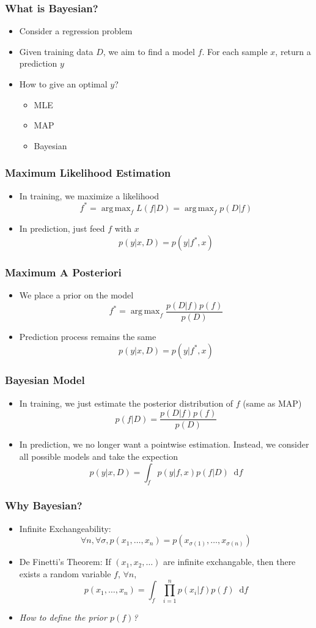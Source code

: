 \documentclass{beamer}
\DeclareMathOperator*{\argmax}{arg\,max}
\newcommand*\diff{\mathop{}\!\mathrm{d}}
\begin{document}
\begin{frame}
	\frametitle{What is Bayesian?}
	\begin{itemize}
		\item Consider a regression problem
		\item Given training data $D$, we aim to find a model $f$. For each sample $x$, return a prediction $y$
		\item How to give an optimal $y$?
		\begin{itemize}
			\pause
			\item MLE
			\item MAP
			\item Bayesian
		\end{itemize}
	\end{itemize}
\end{frame}
\begin{frame}
	\frametitle{Maximum Likelihood Estimation}
	\begin{itemize}
		\item In training, we maximize a likelihood
		\[
			f^* = \argmax_f L(f|D) = \argmax_f p(D|f)
		\]
		\item In prediction, just feed $f$ with $x$
		\[
			p(y|x, D)=p(y|f^*, x)
		\]
	\end{itemize}
\end{frame}
\begin{frame}
	\frametitle{Maximum A Posteriori}
	\begin{itemize}
		\item We place a prior on the model
		\[
			f^* = \argmax_f \frac{p(D|f)p(f)}{p(D)}
		\]
		\item Prediction process remains the same
		\[
			p(y|x, D)=p(y|f^*, x)
		\]
	\end{itemize}
\end{frame}
\begin{frame}
	\frametitle{Bayesian Model}
	\begin{itemize}
		\item In training, we just estimate the posterior distribution of $f$ (same as MAP)
		\[
			p(f|D) = \frac{p(D|f)p(f)}{p(D)}
		\]
		\item In prediction, we no longer want a pointwise estimation. Instead, we consider all possible models and take the expection
		\[
			p(y|x, D)=\int_f p(y|f,x)p(f|D)\diff f
		\]
	\end{itemize}
\end{frame}
\begin{frame}
	\frametitle{Why Bayesian?}
	\begin{itemize}
		\item Infinite Exchangeability:
		\[
		\forall n, \forall \sigma, p(x_1, \ldots, x_n)=p(x_{\sigma(1)},\ldots, x_{\sigma(n)})
		\]
		\item De Finetti’s Theorem: If $(x_1, x_2, \ldots)$ are infinite exchangable, then there exists a random variable $f$, $\forall n$, 
		\[
		p(x_1, \ldots, x_n) = \int_{f} \prod_{i=1}^n p(x_i|f)p(f) \diff f
		\]
		\pause
		\item \em{How to define the prior $p(f)$}?
	\end{itemize}		
\end{frame}
\end{document}
